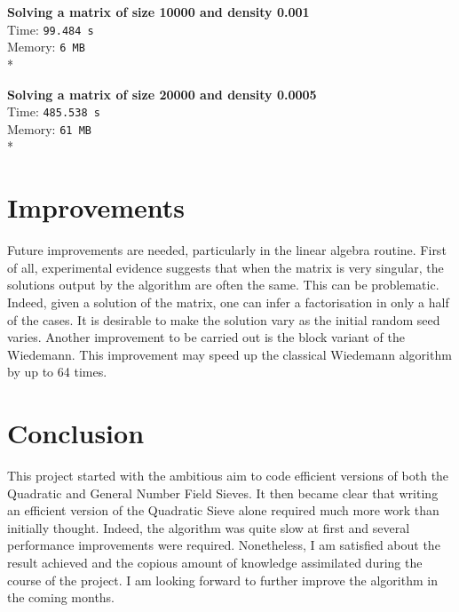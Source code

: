 \documentclass{amsart}
\theoremstyle{definition}
\theoremstyle{remark}
\numberwithin{equation}{section}
\begin{document}
\textbf{Solving a matrix of size 10000 and density 0.001}\\
Time: \texttt{99.484 s} \\
Memory: \texttt{6 MB} \\*

\textbf{Solving a matrix of size 20000 and density 0.0005}\\
Time: \texttt{485.538 s} \\
Memory: \texttt{61 MB} \\*

\section{Improvements}

Future improvements are needed, particularly in the linear algebra routine. First of all, experimental evidence suggests that when the matrix is very singular, the solutions output by the algorithm are often the same. This can be problematic. Indeed, given a solution of the matrix, one can infer a factorisation in only a half of the cases. It is desirable to make the solution vary as the initial random seed varies. Another improvement to be carried out is the block variant of the Wiedemann. This improvement may speed up the classical Wiedemann algorithm by up to 64 times.

\section{Conclusion}

This project started with the ambitious aim to code efficient versions of both the Quadratic and General Number Field Sieves. It then became clear that writing an efficient version of the Quadratic Sieve alone required much more work than initially thought. Indeed, the algorithm was quite slow at first and several performance improvements were required. Nonetheless, I am satisfied about the result achieved and the copious amount of knowledge assimilated during the course of the project. I am looking forward to further improve the algorithm in the coming months.
\end{document}
